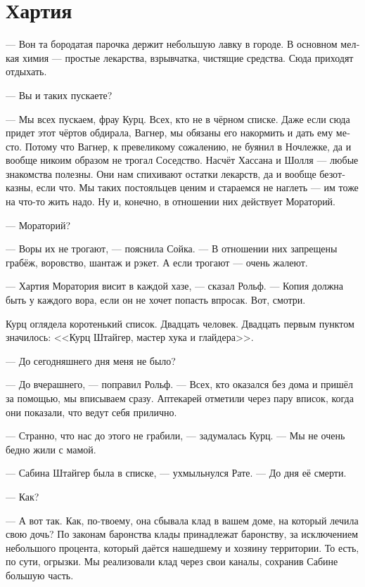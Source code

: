\documentclass[a4paper,12pt,fleqn]{book}\usepackage{polyglossia}\setdefaultlanguage[babelshorthands=true]{russian}\setotherlanguage{english}\defaultfontfeatures{Ligatures=TeX,Mapping=tex-text}\usepackage{xcolor}\newcommand{\ml}[3]{#2}
\begin{document}
\section{Хартия}

--- Вон та бородатая парочка держит небольшую лавку в городе.
В основном мелкая химия --- простые лекарства, взрывчатка, чистящие средства.
Сюда приходят отдыхать.

--- Вы и таких пускаете?

--- Мы всех пускаем, фрау Курц.
Всех, кто не в чёрном списке.
Даже если сюда придет этот чёртов обдирала, Вагнер, мы обязаны его накормить и дать ему место.
Потому что Вагнер, к превеликому сожалению, не буянил в Ночлежке, да и вообще никоим образом не трогал Соседство.
Насчёт Хассана и Шолля --- любые знакомства полезны. 
Они нам спихивают остатки лекарств, да и вообще безотказны, если что.
Мы таких постояльцев ценим и стараемся не наглеть --- им тоже на что-то жить надо.
Ну и, конечно, в отношении них действует Мораторий.

--- Мораторий?

--- Воры их не трогают, --- пояснила Сойка.
--- В отношении них запрещены грабёж, воровство, шантаж и рэкет.
А если трогают --- очень жалеют.

--- Хартия Моратория висит в каждой хазе, --- сказал Рольф.
--- Копия должна быть у каждого вора, если он не хочет попасть впросак.
Вот, смотри.

Курц оглядела коротенький список.
Двадцать человек.
Двадцать первым пунктом значилось: <<Курц Штайгер, мастер хука и глайдера>>.

--- До сегодняшнего дня меня не было?

--- До вчерашнего, --- поправил Рольф.
--- Всех, кто оказался без дома и пришёл за помощью, мы вписываем сразу.
Аптекарей отметили через пару вписок, когда они показали, что ведут себя прилично.

--- Странно, что нас до этого не грабили, --- задумалась Курц.
--- Мы не очень бедно жили с мамой.

--- Сабина Штайгер была в списке, --- ухмыльнулся Рате.
--- До дня её смерти.

--- Как?

--- А вот так.
Как, по-твоему, она сбывала клад в вашем доме, на который лечила свою дочь?
По законам баронства клады принадлежат баронству, за исключением небольшого процента, который даётся нашедшему и хозяину территории.
То есть, по сути, огрызки.
Мы реализовали клад через свои каналы, сохранив Сабине большую часть.
\end{document}
